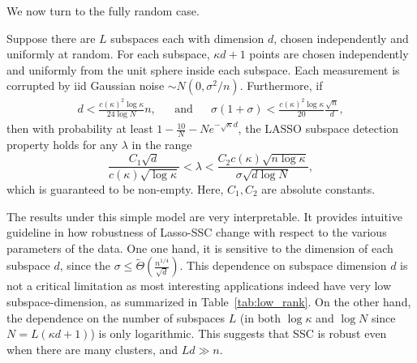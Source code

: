 \documentclass[twoside,11pt]{article}
\numberwithin{equation}{section}
\begin{document}


We now turn to the fully random case.
\begin{theorem}\label{thm:fullrandom}
Suppose there are $L$ subspaces each with dimension $d$, chosen independently and uniformly at random. For each subspace, $\kappa d+1$ points are chosen independently and uniformly from the unit sphere inside each subspace. Each measurement is corrupted by iid Gaussian noise $\sim N(0,\sigma^2/n)$. Furthermore, if
\begin{align*}
  d < \frac{c(\kappa)^2\log\kappa}{24\log N} n, &&\text{and} && \sigma(1+\sigma) < \frac{c(\kappa)^2\log \kappa  }{20}\frac{\sqrt{n} }{d},
\end{align*}
then with probability at least $1-\frac{10}{N}-Ne^{-\sqrt{\kappa}d}$, the LASSO subspace detection property holds for any $\lambda$ in the range
\begin{equation}\label{eq:thm_rand_lambda_range}
  \frac{C_1\sqrt{d}}{c(\kappa)\sqrt{\log \kappa}}<\lambda <  \frac{C_2c(\kappa)\sqrt{n\log\kappa}}{\sigma\sqrt{d\log N}},
\end{equation}
which is guaranteed to be non-empty. Here, $C_1,C_2$ are absolute constants.
\end{theorem}
The results under this simple model are very interpretable. It
 provides intuitive guideline in how robustness of Lasso-SSC change with respect to the various parameters of the data.
 One one hand, it is sensitive to the dimension of each subspace $d$, since the $\sigma \leq \tilde{\Theta}(\frac{n^{1/4}}{\sqrt{d}})$. This dependence on subspace dimension $d$ is not a critical limitation as most interesting applications indeed have very low subspace-dimension, as summarized in Table~\ref{tab:low_rank}.
On the other hand, the dependence on the number of subspaces $L$ (in both $\log\kappa$ and $\log N$ since $N=L(\kappa d+1)$) is only logarithmic.  This suggests that SSC is robust even when there are many clusters, and $Ld\gg n$.
\end{document}
